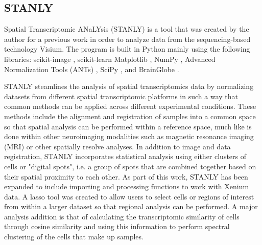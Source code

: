 \documentclass{article}
\begin{document}
\subsection{STANLY}

Spatial Transcriptomic ANaLYsis (STANLY) is a tool that was created by the author for a previous work \cite{visiumSD} in order to analyze data from the sequencing-based technology Visium. The program is built in Python mainly using the following libraries: scikit-image \cite{scikit-image}, scikit-learn \cite{scikit-learn} Matplotlib \cite{matplotlib}, NumPy \cite{NumPy}, Advanced Normalization Tools (ANTs) \cite{ANTs}, SciPy \cite{SciPy}, and BrainGlobe \cite{BrainGlobe}. 

STANLY steamlines the analysis of spatial transcriptomics data by normalizing datasets from different spatial transcriptomic platforms in such a way that common methods can be applied across different experimental conditions. These methods include the alignment and registration of samples into a common space so that spatial analysis can be performed within a reference space, much like is done within other neuroimaging modalities such as magnetic resonance imaging (MRI) or other spatially resolve analyses. In addition to image and data registration, STANLY incorporates statistical analysis using either clusters of cells or "digital spots", i.e. a group of spots that are combined together based on their spatial proximity to each other. As part of this work, STANLY has been expanded to include importing and processing functions to work with Xenium data. A lasso tool was created to allow users to select cells or regions of interest from within a larger dataset so that regional analysis can be performed. A major analysis addition is that of calculating the transcriptomic similarity of cells through cosine similarity and using this information to perform spectral clustering of the cells that make up samples.
\end{document}
